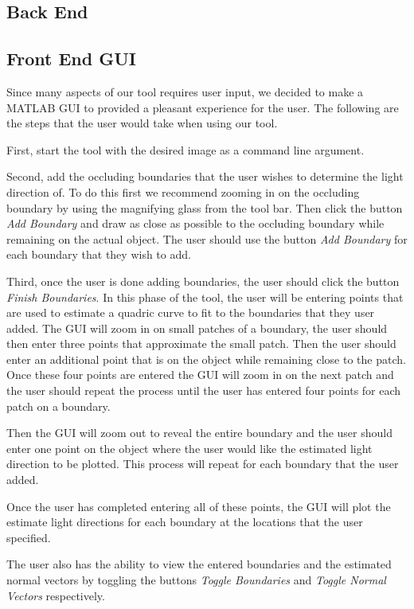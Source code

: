 \documentclass[10pt,twocolumn,letterpaper]{article}
\begin{document}
\subsection{Back End}

\subsection{Front End GUI}
Since many aspects of our tool requires user input, we decided to make a MATLAB GUI to provided a pleasant experience for the user. The following are the steps that the user would take when using our tool. 

First, start the tool with the desired image as a command line argument. 

Second, add the occluding boundaries that the user wishes to determine the light direction of. To do this first we recommend zooming in on the occluding boundary by using the magnifying glass from the tool bar. Then click the button \emph{Add Boundary} and draw as close as possible to the occluding boundary while remaining on the actual object. The user should use the button \emph{Add Boundary} for each boundary that they wish to add. 

Third, once the user is done adding boundaries, the user should click the button \emph{Finish Boundaries}. In this phase of the tool, the user will be entering points that are used to estimate a quadric curve to fit to the boundaries that they user added. The GUI will zoom in on small patches of a boundary, the user should then enter three points that approximate the small patch. Then the user should enter an additional point that is on the object while remaining close to the patch. Once these four points are entered the GUI will zoom in on the next patch and the user should repeat the process until the user has entered four points for each patch on a boundary. 

Then the GUI will zoom out to reveal the entire boundary and the user should enter one point on the object where the user would like the estimated light direction to be plotted. This process will repeat for each boundary that the user added.

Once the user has completed entering all of these points, the GUI will plot the estimate light directions for each boundary at the locations that the user specified.

The user also has the ability to view the entered boundaries and the estimated normal vectors by toggling the buttons \emph{Toggle Boundaries} and \emph{Toggle Normal Vectors} respectively. 
\end{document}

